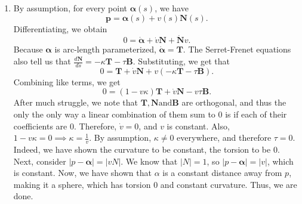 \documentclass[12pt]{article}
\newcommand{\magnitude}[1]{\left\lvert #1 \right\rvert}
\begin{document}
\begin{enumerate}[label=\Alph*., leftmargin=*]
\begin{equation*}
\begin{bmatrix}
            0\\
            1
        \end{bmatrix}.
    \end{equation*} Next, we compute $\bm{B}$.\begin{equation*}
        \bm{B}=(0-0, \frac{-4u^2-1}{4u^2+1}, 0-0)=(0, -1, 0).
    \end{equation*} Again, by observation, $\frac{d\bm{B}}{ds}=0$, and $\bm{N}$ is non-zero when $x\leq 0$, so $\tau = 0$. We can see that when $x>0$, $\bm{\alpha}$ lies completely in the $xy$-plane as it has no $z$ component, and when $x\leq0$, $\bm{\alpha}$ lies completely in the $xz$-plane, as it has no $y$ component.
\item By assumption, for every point $\bm{\alpha}(s)$, we have\begin{equation*}
    \bm{p}=\bm{\alpha}(s)+v(s)\bm{N}(s).
\end{equation*} Differentiating, we obtain\begin{equation*}
    0=\dot{\bm{\alpha}}+\dot{v}\bm{N}+\dot{\bm{N}}v.
\end{equation*}
Because $\bm{\alpha}$ is arc-length parameterized, $\dot{\bm{\alpha}}=\bm{T}$. The Serret-Frenet equations also tell us that $\frac{d\bm{N}}{ds}=-\kappa \bm{T} -\tau \bm{B}$. Substituting, we get that\begin{equation*}
    0=\bm{T}+\dot{v}\bm{N}+v(-\kappa \bm{T}-\tau \bm{B}).
\end{equation*} Combining like terms, we get\begin{equation*}
    0=(1-v\kappa)\bm{T}+\dot{v}\bm{N}-v\tau \bm{B}.
\end{equation*} After much struggle, we note that $\bm{T}, \bm{N} \text{and} \bm{B}$ are orthogonal, and thus the only the only way a linear
combination of them sum to 0 is if each of their coefficients are 0. Therefore, $\dot{v}=0$, and $v$ is constant. Also, $1-v\kappa=0\implies \kappa=\frac{1}{v}$. By assumption, $\kappa\neq 0$ everywhere,
and therefore $\tau=0$. Indeed, we have shown the curvature to be constant, the torsion to be 0. Next, consider $\magnitude{p-\bm{\alpha}}=\magnitude{vN}$. We know that $\magnitude{N}=1$, so $\magnitude{p-\bm{\alpha}}=\magnitude{v}$, which is constant.
Now, we have shown that $\alpha$ is a constant distance away from $p$, making it a sphere, which has torsion 0 and constant curvature. Thus, we are done.
\end{enumerate}
\end{document}
